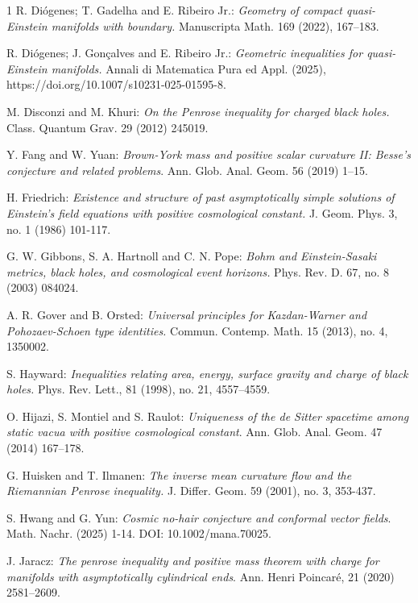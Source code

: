 \documentclass{amsart}
\numberwithin{equation}{section}
\begin{document}
\begin{thebibliography}{1}
 R. Di\'ogenes; T. Gadelha and E. Ribeiro Jr.: \emph{Geometry of compact quasi-Einstein manifolds with boundary.} Manuscripta Math. 169 (2022), 167--183.

  R. Di\'ogenes; J. Gonçalves and E. Ribeiro Jr.: \emph{Geometric inequalities for quasi-Einstein manifolds.} Annali di Matematica Pura ed Appl. (2025), https://doi.org/10.1007/s10231-025-01595-8.

 M. Disconzi and M. Khuri: \emph{On the Penrose inequality for charged black holes.} Class. Quantum Grav. 29 (2012) 245019.

 Y. Fang and W. Yuan: {\it Brown-York mass and positive scalar curvature II: Besse’s conjecture and related problems}. Ann. Glob. Anal. Geom. 56 (2019) 1--15.

 H. Friedrich: \emph{Existence and structure of past asymptotically simple solutions of Einstein's field equations with positive cosmological constant.} J. Geom. Phys. 3, no. 1 (1986) 101-117. 

 G. W. Gibbons, S. A. Hartnoll and C. N. Pope: \emph{Bohm and Einstein-Sasaki metrics, black
holes, and cosmological event horizons.} Phys. Rev. D. 67,  no. 8 (2003) 084024.

 A. R. Gover and B. Orsted: \emph{Universal principles for Kazdan-Warner and Pohozaev-Schoen type identities.} Commun. Contemp. Math. 15 (2013), no. 4, 1350002.

 S. Hayward: \emph{Inequalities relating area, energy, surface gravity and charge of black holes.} Phys. Rev. Lett., 81 (1998), no. 21, 4557--4559.


 O. Hijazi, S. Montiel and S. Raulot: {\it Uniqueness of the de Sitter spacetime among static vacua with positive cosmological constant}. Ann. Glob. Anal. Geom. 47 (2014) 167--178.

		
		 G. Huisken and T. Ilmanen: \emph{The inverse mean curvature flow and the Riemannian Penrose inequality.} J. Differ. Geom. 59 (2001), no. 3, 353-437.
		
		  S. Hwang and G. Yun: {\it Cosmic no-hair conjecture and conformal vector fields}. Math. Nachr. (2025) 1-14. DOI: 10.1002/mana.70025.
		 
		 
		  J. Jaracz: \textit{The penrose inequality and positive mass theorem with charge for manifolds with asymptotically cylindrical ends}. Ann. Henri Poincar\'e, 21 (2020) 2581--2609.


\end{thebibliography}
\end{document}
